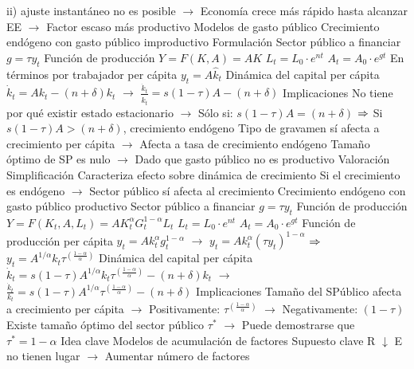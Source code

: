 \documentclass{nuevotema}
\begin{document}
\begin{esquemal}
				\4[] ii) ajuste instantáneo no es posible
				\4[] $\to$ Economía crece más rápido hasta alcanzar EE
				\4[] $\to$ Factor escaso más productivo
		\2 Modelos de gasto público
			\3 Crecimiento endógeno con gasto público improductivo
				\4 Formulación
				\4[] Sector público a financiar
				\4[] $g = \tau y_t$
				\4[] Función de producción
				\4[] $Y = F(K, A) = A K$
				\4[] $L_t = L_0 \cdot e^{nt}$
				\4[] $A_t = A_0 \cdot e^{gt}$
				\4[] En términos por trabajador per cápita
				\4[] $y_t = A \hat{k}_t$
				\4[] Dinámica del capital per cápita
				\4[] $\dot{k}_t =  A {k}_t - (n+\delta){k}_t$
				\4[] $\to$ $\frac{\dot{{k}}_t}{\hat{k}_t} = s(1-\tau)A - (n+\delta)$
				\4 Implicaciones
				\4[] No tiene por qué existir estado estacionario
				\4[] $\to$ Sólo si: $s(1-\tau)A = \left( n+\delta \right)$
				\4[] $\Rightarrow$ Si $s(1-\tau)A > \left( n+\delta \right)$, crecimiento endógeno
				\4[] Tipo de gravamen sí afecta a crecimiento per cápita
				\4[] $\to$ Afecta a tasa de crecimiento endógeno
				\4[] Tamaño óptimo de SP es nulo
				\4[] $\to$ Dado que gasto público no es productivo
				\4 Valoración
				\4[] Simplificación
				\4[] Caracteriza efecto sobre dinámica de crecimiento
				\4[] Si el crecimiento es endógeno
				\4[] $\to$ Sector público sí afecta al crecimiento
			\3 Crecimiento endógeno con gasto público productivo
				\4 Sector público a financiar
				\4[] $g = \tau y_t$
				\4[] Función de producción
				\4[] $Y = F(K_t, A, L_t) = A K_t^\alpha G_t^{1-\alpha} L_t$
				\4[] $L_t = L_0 \cdot e^{nt}$
				\4[] $A_t = A_0 \cdot e^{gt}$
				\4[] Función de producción per cápita
				\4[] $y_t = A k_t^\alpha g_t^{1-\alpha}$
				\4[] $\to$ $y_t = A k_t^\alpha (\tau y_t)^{1-\alpha}$
				\4[] $\Rightarrow$ $y_t = A^{1/\alpha} k_t \tau^{\left( \frac{1-\alpha}{\alpha} \right) }$
				\4[] Dinámica del capital per cápita
				\4[] $\dot{k}_t =  s(1-\tau)A^{1/\alpha} {k}_t \tau^{\left( \frac{1-\alpha}{\alpha} \right)} - (n+\delta){k}_t$
				\4[] $\to$ $\frac{\dot{k}_t}{k_t} = s(1-\tau)A^{1/\alpha}\tau^{\left( \frac{1-\alpha}{\alpha} \right)} - (n+\delta)$
				\4[] Implicaciones
				\4[] Tamaño del SPúblico afecta a crecimiento per cápita
				\4[] $\to$ Positivamente: $\tau^{\left( \frac{1-\alpha}{\alpha} \right)}$
				\4[] $\to$ Negativamente: $(1-\tau)$
				\4[] Existe tamaño óptimo del sector público $\tau^*$
				\4[] $\to$ Puede demostrarse que $\tau^* = 1-\alpha$
	\1 
		\2 Idea clave
			\3 Modelos de acumulación de factores
				\4 Supuesto clave
				\4[] R $\downarrow$ E no tienen lugar
				\4[] $\to$ Aumentar número de factores

\end{esquemal}
\end{document}
